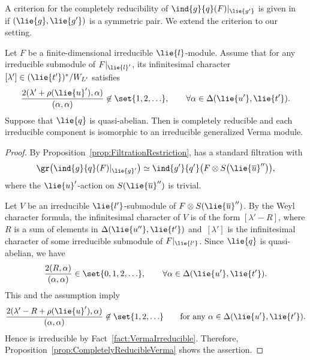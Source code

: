 A criterion for the completely reducibility of $\ind{g}{q}(F)|_{\lie{g'}}$ is given in~\cite[Lemma~3.1]{EnPaWaWo85} if $(\lie{g}, \lie{g'})$ is a symmetric pair.
We extend the criterion to our setting.

\begin{Lemma}\label{lem:QuasiAbelianCompletelyReducible}
	Let $F$ be a finite-dimensional irreducible $\lie{l}$-module.
	Assume that for any irreducible submodule of $F|_{\lie{l}'}$, its infinitesimal character $[\lambda'] \in (\lie{t'})^*/W_{L'}$ satisfies
	\begin{align*}
		\frac{2(\lambda'+\rho(\lie{u}'), \alpha)}{(\alpha, \alpha)} \not \in \set{1, 2, \ldots}, \qquad \forall \alpha \in \Delta(\lie{u'}, \lie{t'}).
	\end{align*}
	Suppose that $\lie{q}$ is quasi-abelian.
	Then  is completely reducible and each irreducible component is isomorphic to an irreducible generalized Verma module.
\end{Lemma}

\begin{proof}
	By Proposition~\ref{prop:FiltrationRestriction},  has a standard filtration with
	\begin{align*}
		\gr\bigl(\ind{g}{q}(F)|_{\lie{g}'}\bigr) \simeq \ind{g'}{q'}\bigl(F\otimes S\bigl(\lie{\overline{u}}''\bigr)\bigr),
	\end{align*}
	where the $\lie{u}'$-action on $S(\lie{\overline{u}}'')$ is trivial.

	Let $V$ be an irreducible $\lie{l'}$-submodule of $F\otimes S(\lie{\overline{u}}'')$.
	By the Weyl character formula, the infinitesimal character of $V$ is of the form $[\lambda' - R]$,
	where $R$ is a sum of elements in $\Delta(\lie{u''}, \lie{t'})$ and~$[\lambda']$ is the infinitesimal character of some irreducible submodule of $F|_{\lie{l'}}$.
	Since $\lie{q}$ is quasi-abelian, we have
	\begin{align*}
		\frac{2(R, \alpha)}{(\alpha, \alpha)} \in \set{0, 1, 2, \ldots}, \qquad \forall \alpha \in \Delta(\lie{u'}, \lie{t'}).
	\end{align*}
	This and the assumption imply
	\begin{align*}
		\frac{2(\lambda'-R+\rho(\lie{u}'), \alpha)}{(\alpha, \alpha)} \not \in \set{1, 2, \ldots}\qquad \text{for any }\alpha \in \Delta(\lie{u'}, \lie{t'}).
	\end{align*}
	Hence  is irreducible by Fact~\ref{fact:VermaIrreducible}.
	Therefore, Proposition~\ref{prop:CompletelyReducibleVerma} shows the assertion.
\end{proof}

